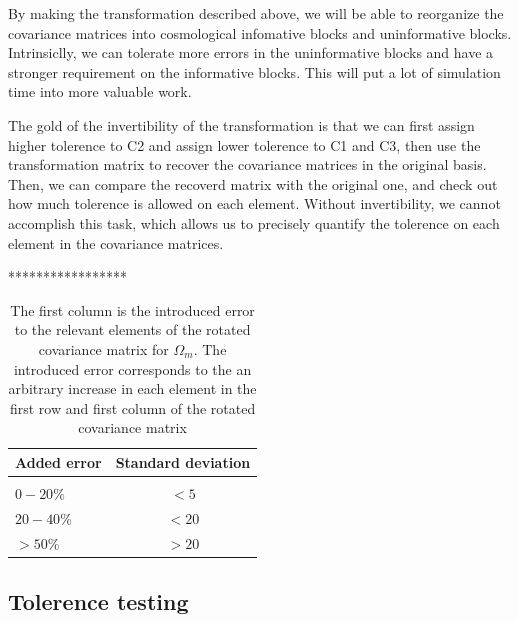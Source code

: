 \documentclass[twocolumn]{\docclass}
\begin{document}
By making the transformation described above, we will be able to reorganize the covariance matrices into cosmological infomative blocks and uninformative blocks. Intrinsiclly, we can tolerate more errors in the uninformative blocks and have a stronger requirement on the informative blocks. This will put a lot of simulation time into more valuable work.

The gold of the invertibility of the transformation is that we can first assign higher tolerence to C2 and assign lower tolerence to C1 and C3, then use the transformation matrix to recover the covariance matrices in the original basis. Then, we can compare the recoverd matrix with the original one, and check out how much tolerence is allowed on each element. Without invertibility, we cannot accomplish this task, which allows us to precisely quantify the tolerence on each element in the covariance matrices.

*****************
 
 \begin{table}
\centering
\begin{tabular} { l c} 
\hline
\hline
Added error	& Standard deviation 	\\ \hline \\
$0 - 20 \% $		& 	$< 5$	\\
$20 - 40 \% $		& 	$< 20$	\\
$> 50 \% $		& 	$> 20$	\\ [1ex]
\hline
\hline
\end{tabular}
\caption{The first column is the introduced error to the relevant elements of the rotated covariance matrix for $\Omega_m$. The introduced error corresponds to the an arbitrary increase in each element in the first row and first column of the rotated covariance matrix }
\label{tab:error_budget}
\end{table}

\subsection{Tolerence testing}
\end{document}
